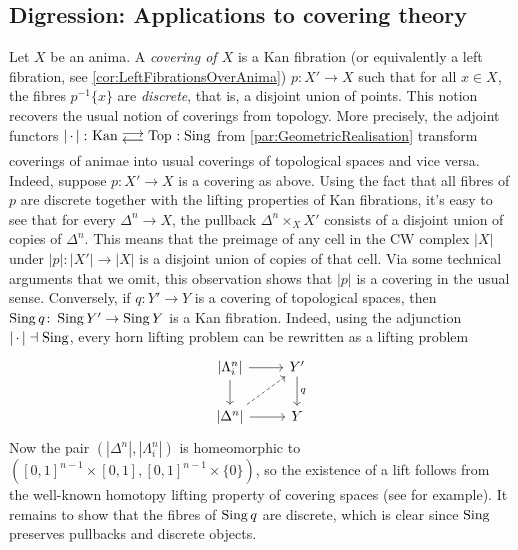 \subsection{Digression: Applications to covering theory}
\begin{numpar}
	Let $X$ be an anima. A \emph{covering of $X$} is a Kan fibration (or equivalently a left fibration, see \cref{cor:LeftFibrationsOverAnima}) $p\colon X'\rightarrow X$ such that for all $x\in X$, the fibres $p^{-1}\{x\}$ are \emph{discrete}, that is, a disjoint union of points. This notion recovers the usual notion of coverings from topology. More precisely, the adjoint functors $\left|\,\cdot\,\right|\colon \cat{Kan}\doublelrmorphism \cat{Top}\noloc \Sing$ from \cref{par:GeometricRealisation} transform coverings of animae into usual coverings of topological spaces and vice versa. Indeed, suppose $p\colon X'\rightarrow X$ is a covering as above. Using the fact that all fibres of $p$ are discrete together with the lifting properties of Kan fibrations, it's easy to see that for every $\Delta^n\rightarrow X$, the pullback $\Delta^n\times_XX'$ consists of a disjoint union of copies of $\Delta^n$. This means that the preimage of any cell in the CW complex $\left|X\right|$ under $\left|p\right|\colon \left|X'\right|\rightarrow \left|X\right|$ is a disjoint union of copies of that cell. Via some technical arguments that we omit, this observation shows that $\left|p\right|$ is a covering in the usual sense. Conversely, if $q\colon Y'\rightarrow Y$ is a covering of topological spaces, then $\operatorname{Sing} q\colon \operatorname{Sing} Y'\rightarrow\operatorname{Sing} Y$ is a Kan fibration. Indeed, using the adjunction $\left|\,\cdot\,\right|\dashv \operatorname{Sing}$, every horn lifting problem can be rewritten as a lifting problem
	\begin{equation*}
		\begin{tikzcd}
			\left|\Lambda_i^n\right|\rar\dar & Y'\dar["q"]\\
			\left|\Delta^n\right|\rar\urar[dashed] & Y
		\end{tikzcd}
	\end{equation*}
	Now the pair $(\left|\Delta^n\right|,\left|\Lambda_i^n\right|)$ is homeomorphic to $([0,1]^{n-1}\times[0,1],[0,1]^{n-1}\times\{0\})$, so the existence of a lift follows from the well-known homotopy lifting property of covering spaces (see \cite[Proposition~\href{https://pi.math.cornell.edu/~hatcher/AT/AT.pdf\#page=69}{1.30}]{Hatcher} for example). It remains to show that the fibres of $\operatorname{Sing} q$ are discrete, which is clear since $\operatorname{Sing}$ preserves pullbacks and discrete objects.
	

\end{numpar}
